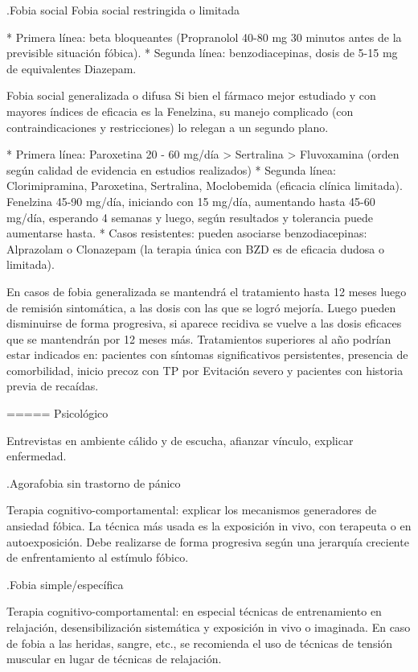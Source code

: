 .Fobia social
Fobia social restringida o limitada

* Primera línea: beta bloqueantes (Propranolol 40-80 mg 30 minutos antes de la previsible situación fóbica).
* Segunda línea: benzodiacepinas, dosis de 5-15 mg de equivalentes Diazepam.

Fobia social generalizada o difusa Si bien el fármaco mejor estudiado y con mayores índices de eficacia es la Fenelzina, su manejo complicado (con contraindicaciones y restricciones) lo relegan a un segundo plano.

* Primera línea: Paroxetina 20 - 60 mg/día > Sertralina > Fluvoxamina (orden según calidad de evidencia en estudios realizados)
* Segunda línea: Clorimipramina, Paroxetina, Sertralina, Moclobemida (eficacia clínica limitada). Fenelzina 45-90 mg/día, iniciando con 15 mg/día, aumentando hasta 45-60 mg/día, esperando 4 semanas y luego, según resultados y tolerancia puede aumentarse hasta.
* Casos resistentes: pueden asociarse benzodiacepinas: Alprazolam o Clonazepam (la terapia única con BZD es de eficacia dudosa o limitada).

En casos de fobia generalizada se mantendrá el tratamiento hasta 12 meses luego de remisión sintomática, a las dosis con las que se logró mejoría. Luego pueden disminuirse de forma progresiva, si aparece recidiva se vuelve a las dosis eficaces que se mantendrán por 12 meses más. Tratamientos superiores al año podrían estar indicados en: pacientes con síntomas significativos persistentes, presencia de comorbilidad, inicio precoz con TP por Evitación severo y pacientes con historia previa de recaídas.

===== Psicológico

Entrevistas en ambiente cálido y de escucha, afianzar vínculo, explicar enfermedad.

.Agorafobia sin trastorno de pánico

Terapia cognitivo-comportamental: explicar los mecanismos generadores de ansiedad fóbica. La técnica más usada es la exposición in vivo, con terapeuta o en autoexposición. Debe realizarse de forma progresiva según una jerarquía creciente de enfrentamiento al estímulo fóbico.

.Fobia simple/específica

Terapia cognitivo-comportamental: en especial técnicas de entrenamiento en relajación, desensibilización sistemática y exposición in vivo o imaginada. En caso de fobia a las heridas, sangre, etc., se recomienda el uso de técnicas de tensión muscular en lugar de técnicas de relajación.

